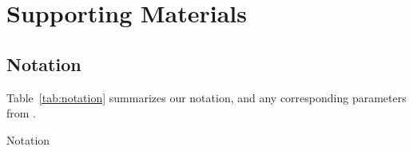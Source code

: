 \section{Supporting Materials}
\subsection{Notation}\label{app.notation}
Table~\ref{tab:notation} summarizes our notation,
and any corresponding parameters from \cite{Arenas2020}.
\begin{table}[ht]
  \centering
  \caption{Notation}
  
  \label{tab:notation}
\end{table}
